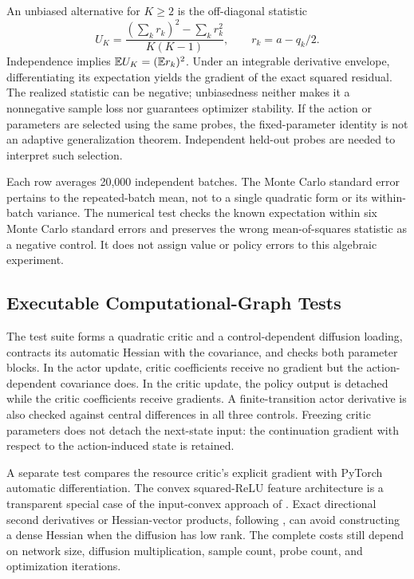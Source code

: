 An unbiased alternative for $K\geq2$ is the off-diagonal statistic
\[
 U_K=\frac{(\sum_kr_k)^2-\sum_kr_k^2}{K(K-1)},\qquad r_k=a-q_k/2.
\]
Independence implies $\mathbb E U_K=(\mathbb E r_k)^2$. Under an integrable derivative envelope, differentiating its expectation yields the gradient of the exact squared residual. The realized statistic can be negative; unbiasedness neither makes it a nonnegative sample loss nor guarantees optimizer stability. If the action or parameters are selected using the same probes, the fixed-parameter identity is not an adaptive generalization theorem. Independent held-out probes are needed to interpret such selection.



Each row averages 20,000 independent batches. The Monte Carlo standard error pertains to the repeated-batch mean, not to a single quadratic form or its within-batch variance. The numerical test checks the known expectation within six Monte Carlo standard errors and preserves the wrong mean-of-squares statistic as a negative control. It does not assign value or policy errors to this algebraic experiment.

\subsection{Executable Computational-Graph Tests}
The test suite forms a quadratic critic and a control-dependent diffusion loading, contracts its automatic Hessian with the covariance, and checks both parameter blocks. In the actor update, critic coefficients receive no gradient but the action-dependent covariance does. In the critic update, the policy output is detached while the critic coefficients receive gradients. A finite-transition actor derivative is also checked against central differences in all three controls. Freezing critic parameters does not detach the next-state input: the continuation gradient with respect to the action-induced state is retained.

A separate test compares the resource critic's explicit gradient with PyTorch automatic differentiation. The convex squared-ReLU feature architecture is a transparent special case of the input-convex approach of \citet{amos2017}. Exact directional second derivatives or Hessian-vector products, following \citet{pearlmutter1994}, can avoid constructing a dense Hessian when the diffusion has low rank. The complete costs still depend on network size, diffusion multiplication, sample count, probe count, and optimization iterations.
